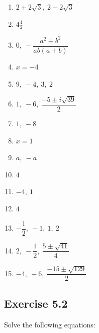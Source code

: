 \documentclass[12pt,a4paper]{article}
\begin{document}
\begin{enumerate}[label=Example \arabic*.]
    \item \( 2 + 2\sqrt{3},\ 2 - 2\sqrt{3} \)
    \item \( 4\frac{1}{2} \)
    \item \( 0,\ -\dfrac{a^2 + b^2}{ab(a + b)} \)
    \item \( x = -4 \)
    \item \( 9,\ -4,\ 3,\ 2 \)
    \item \( 1,\ -6,\ \dfrac{-5 \pm i\sqrt{39}}{2} \)
    \item \( 1,\ -8 \)
    \item \( x = 1 \)
    \item \( a,\ -a \)
    \item \( 4 \)
    \item \( -4,\ 1 \)
    \item \( 4 \)
    \item \( -\dfrac{1}{2},\ -1,\ 1,\ 2 \)
    \item \( 2,\ -\dfrac{1}{2},\ \dfrac{5 \pm \sqrt{41}}{4} \)
    \item \( -4,\ -6,\ \dfrac{-15 \pm \sqrt{129}}{2} \)
\end{enumerate}

\subsection{Exercise 5.2}

Solve the following equations:
\end{document}
